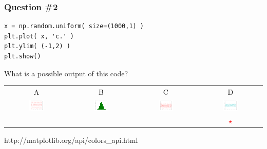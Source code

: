 \documentclass[11pt]{beamer}
\newcommand{\correctstar}{\textcolor{red}{$\star$}}
\begin{document}
\begin{frame}[fragile]
  \frametitle{Question \#2}
  \Enlarge

  \begin{Verbatim}
x = np.random.uniform( size=(1000,1) )
plt.plot( x, 'c.' )
plt.ylim( (-1,2) )
plt.show()
  \end{Verbatim}

  What is a possible output of this code?

  \begin{center}
  \begin{tabular}{cccc}
    A & B & C & D \\
    \includegraphics[width=0.25\textwidth]{./img/figure_2.png}
    &
    \includegraphics[width=0.25\textwidth]{./img/figure_3.png}
    &
    \includegraphics[width=0.25\textwidth]{./img/figure_4.png}
    &
    \includegraphics[width=0.25\textwidth]{./img/figure_5.png}
    \\
    & & & \correctstar \\
    
  \end{tabular}
    http://matplotlib.org/api/colors\_api.html
  \end{center}
\end{frame}

\end{document}
